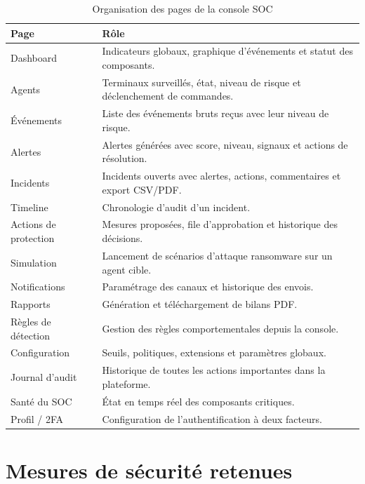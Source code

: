 \begin{table}[htbp]
\centering
\caption{Organisation des pages de la console SOC}
\label{tab:pages-console}
\small
\renewcommand{\arraystretch}{1.3}
\begin{tabularx}{\textwidth}{|p{4.5cm}|X|}
\hline
\textbf{Page} & \textbf{Rôle} \\
\hline
Dashboard & Indicateurs globaux, graphique d'événements et statut des composants. \\
\hline
Agents & Terminaux surveillés, état, niveau de risque et déclenchement de commandes. \\
\hline
Événements & Liste des événements bruts reçus avec leur niveau de risque. \\
\hline
Alertes & Alertes générées avec score, niveau, signaux et actions de résolution. \\
\hline
Incidents & Incidents ouverts avec alertes, actions, commentaires et export CSV/PDF. \\
\hline
Timeline & Chronologie d'audit d'un incident. \\
\hline
Actions de protection & Mesures proposées, file d'approbation et historique des décisions. \\
\hline
Simulation & Lancement de scénarios d'attaque ransomware sur un agent cible. \\
\hline
Notifications & Paramétrage des canaux et historique des envois. \\
\hline
Rapports & Génération et téléchargement de bilans PDF. \\
\hline
Règles de détection & Gestion des règles comportementales depuis la console. \\
\hline
Configuration & Seuils, politiques, extensions et paramètres globaux. \\
\hline
Journal d'audit & Historique de toutes les actions importantes dans la plateforme. \\
\hline
Santé du SOC & État en temps réel des composants critiques. \\
\hline
Profil / 2FA & Configuration de l'authentification à deux facteurs. \\
\hline
\end{tabularx}
\end{table}


\section{Mesures de sécurité retenues}

